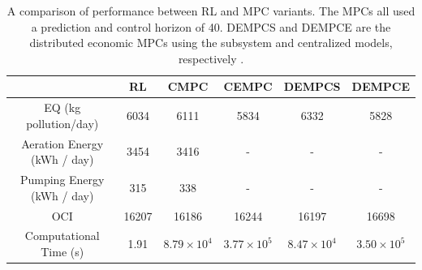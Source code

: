 \begin{table}[H]
\footnotesize
\caption{A comparison of performance between RL and MPC variants. The MPCs all used a prediction and control horizon of 40.  DEMPCS and DEMPCE are the distributed economic MPCs using the subsystem and centralized models, respectively \cite{an_mpc}.}
\centering
\begin{tabular}{c|c|c|c|c|c}
                         &\textbf{RL}     & \textbf{CMPC} & \textbf{CEMPC} & \textbf{DEMPCS} & \textbf{DEMPCE}\\
\hline
EQ (kg pollution/day)  	 &   6034                 & 6111                     &   5834                    &  6332           &	5828	 \\
Aeration Energy (kWh / day) &  3454      &   3416                     &   -       &    -   &	-	 \\
Pumping Energy (kWh / day)  & 315   &   338                     &   -       &   -    &	-	 \\
OCI                       & 16207   &   16186       & 16244         &   16197    &	16698	 \\
Computational Time (s)     &  1.91  &  $8.79 \times 10^4$     &    $3.77 \times 10^5$    &   $8.47 \times 10^4$   &	 $3.50 \times 10^5$	
\label{tab:04rl_vs_mpcs}
\end{tabular}
\end{table}














